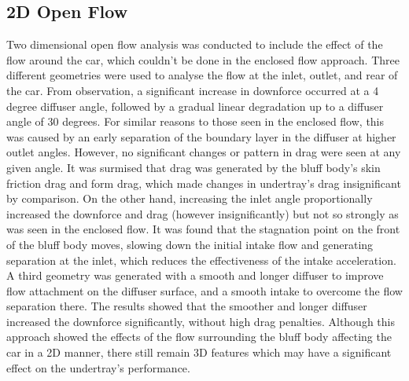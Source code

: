 \subsection{2D Open Flow}
Two dimensional open flow analysis was conducted to include the effect of the flow around the car, which couldn't be done in the enclosed flow approach. Three different geometries were used to analyse the flow at the inlet, outlet, and rear of the car. From observation, a significant increase in downforce occurred at a 4 degree diffuser angle, followed by a gradual linear degradation up to a diffuser angle of 30 degrees. For similar reasons to those seen in the enclosed flow, this was caused by an early separation of the boundary layer in the diffuser at higher outlet angles. However, no significant changes or pattern in drag were seen at any given angle. It was surmised that drag was generated by the bluff body's skin friction drag and form drag, which made changes in undertray's drag insignificant by comparison. On the other hand, increasing the inlet angle proportionally increased the downforce and drag (however insignificantly) but not so strongly as was seen in the enclosed flow. It was found that the stagnation point on the front of the bluff body moves, slowing down the initial intake flow and generating separation at the inlet, which reduces the effectiveness of the intake acceleration. A third geometry was generated with a smooth and longer diffuser to improve flow attachment on the diffuser surface, and a smooth intake to overcome the flow separation there. The results showed that the smoother and longer diffuser increased the downforce significantly, without high drag penalties. Although this approach showed the effects of the flow surrounding the bluff body affecting the car in a 2D manner, there still remain 3D features which may have a significant effect on the undertray's performance.

